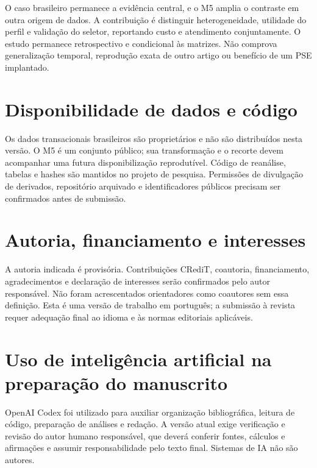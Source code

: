 \documentclass[preprint,12pt]{elsarticle}
\begin{document}
O caso brasileiro permanece a evidência central, e o M5 amplia o contraste em outra origem de dados. A contribuição é distinguir heterogeneidade, utilidade do perfil e validação do seletor, reportando custo e atendimento conjuntamente. O estudo permanece retrospectivo e condicional às matrizes. Não comprova generalização temporal, reprodução exata de outro artigo ou benefício de um PSE implantado.

\section*{Disponibilidade de dados e código}
Os dados transacionais brasileiros são proprietários e não são distribuídos nesta versão. O M5 é um conjunto público; sua transformação e o recorte devem acompanhar uma futura disponibilização reprodutível. Código de reanálise, tabelas e hashes são mantidos no projeto de pesquisa. Permissões de divulgação de derivados, repositório arquivado e identificadores públicos precisam ser confirmados antes de submissão.
\section*{Autoria, financiamento e interesses}
A autoria indicada é provisória. Contribuições CRediT, coautoria, financiamento, agradecimentos e declaração de interesses serão confirmados pelo autor responsável. Não foram acrescentados orientadores como coautores sem essa definição. Esta é uma versão de trabalho em português; a submissão à revista requer adequação final ao idioma e às normas editoriais aplicáveis.
\section*{Uso de inteligência artificial na preparação do manuscrito}
OpenAI Codex foi utilizado para auxiliar organização bibliográfica, leitura de código, preparação de análises e redação. A versão atual exige verificação e revisão do autor humano responsável, que deverá conferir fontes, cálculos e afirmações e assumir responsabilidade pelo texto final. Sistemas de IA não são autores.


\end{document}
